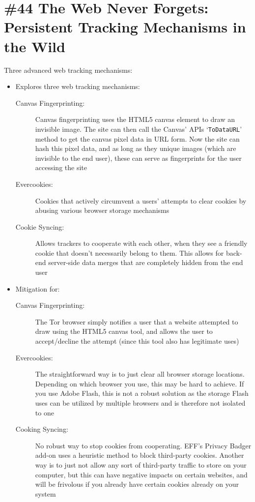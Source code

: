\section{\#44 The Web Never Forgets: Persistent Tracking Mechanisms in the Wild}
Three advanced web tracking mechanisms:
\begin{itemize}
	\item Explores three web tracking mechanisms:
	\begin{description}
		\item[Canvas Fingerprinting:] Canvas fingerprinting uses the HTML5 canvas element to draw an invisible image. The site can then call the Canvas' APIs `\texttt{ToDataURL}' method to get the canvas pixel data in URL form. Now the site can hash this pixel data, and as long as they unique images (which are invisible to the end user), these can serve as fingerprints for the user accessing the site
		\item[Evercookies:] Cookies that actively circumvent a users' attempts to clear cookies by abusing various browser storage mechanisms
		\item[Cookie Syncing:] Allows trackers to cooperate with each other, when they see a friendly cookie that doesn't necessarily belong to them. This allows for back-end server-side data merges that are completely hidden from the end user
	\end{description}
	\item Mitigation for:
	\begin{description}
		\item[Canvas Fingerprinting:] The Tor browser simply notifies a user that a website attempted to draw using the HTML5 canvas tool, and allows the user to accept/decline the attempt (since this tool also has legitimate uses)
		\item[Evercookies:] The straightforward way is to just clear all browser storage locations. Depending on which browser you use, this may be hard to achieve. If you use Adobe Flash, this is not a robust solution as the storage Flash uses can be utilized by multiple browsers and is therefore not isolated to one
		\item[Cooking Syncing:] No robust way to stop cookies from cooperating. EFF's Privacy Badger add-on uses a heuristic method to block third-party cookies. Another way is to just not allow any sort of third-party traffic to store on your computer, but this can have negative impacts on certain websites, and will be frivolous if you already have certain cookies already on your system
	\end{description}
\end{itemize}